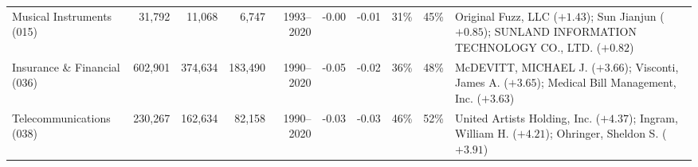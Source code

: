 {\begin{tabular}{l rrrr rr rr >{\raggedright\arraybackslash}p{8.5cm}}
Musical Instruments (015) & 31,792 & 11,068 & 6,747 & 1993--2020 & -0.00 & -0.01 & 31\% & 45\% & Original Fuzz, LLC ($+1.43$); Sun Jianjun ($+0.85$); SUNLAND INFORMATION TECHNOLOGY CO., LTD. ($+0.82$) \\
Insurance \& Financial (036) & 602,901 & 374,634 & 183,490 & 1990--2020 & -0.05 & -0.02 & 36\% & 48\% & McDEVITT, MICHAEL J. ($+3.66$); Visconti, James A. ($+3.65$); Medical Bill Management, Inc. ($+3.63$) \\
Telecommunications (038) & 230,267 & 162,634 & 82,158 & 1990--2020 & -0.03 & -0.03 & 46\% & 52\% & United Artists Holding, Inc. ($+4.37$); Ingram, William H. ($+4.21$); Ohringer, Sheldon S. ($+3.91$) \\
\bottomrule
\end{tabular}%
}
